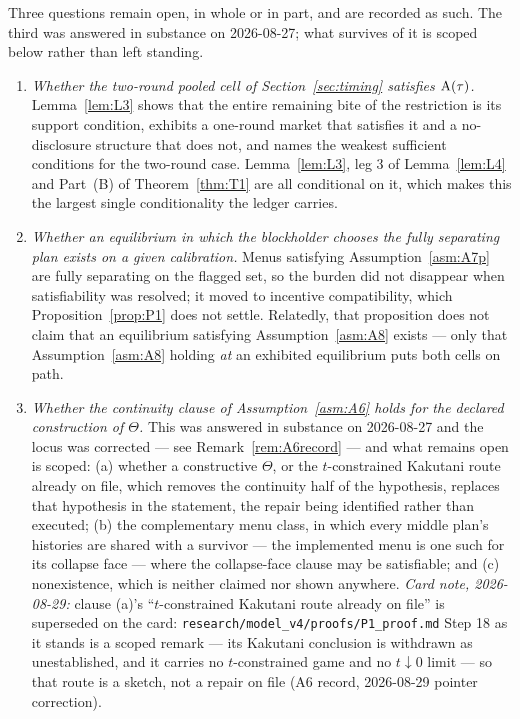 Three questions remain open, in whole or in part, and are recorded as such. The third was answered in
substance on 2026-08-27; what survives of it is scoped below rather than left standing.
\begin{enumerate}[label=(\arabic*),leftmargin=2.4em,itemsep=3pt]
\item \emph{Whether the two-round pooled cell of Section~\ref{sec:timing} satisfies $\mathrm{A}(\tau)$.}
  Lemma~\ref{lem:L3} shows that the entire remaining bite of the restriction is its support
  condition, exhibits a one-round market that satisfies it and a no-disclosure structure that does
  not, and names the weakest sufficient conditions for the two-round case. Lemma~\ref{lem:L3},
  leg 3 of Lemma~\ref{lem:L4} and Part~(B) of Theorem~\ref{thm:T1} are all conditional on it, which
  makes this the largest single conditionality the ledger carries.
\item \emph{Whether an equilibrium in which the blockholder chooses the fully separating plan exists
  on a given calibration.} Menus satisfying Assumption~\ref{asm:A7p} are fully separating on the
  flagged set, so the burden did not disappear when satisfiability was resolved; it moved to
  incentive compatibility, which Proposition~\ref{prop:P1} does not settle. Relatedly, that
  proposition does not claim that an equilibrium satisfying Assumption~\ref{asm:A8} exists --- only
  that Assumption~\ref{asm:A8} holding \emph{at} an exhibited equilibrium puts both cells on path.
\item \emph{Whether the continuity clause of Assumption~\ref{asm:A6} holds for the declared
  construction of $\Theta$.} This was answered in substance on 2026-08-27 and the locus was
  corrected --- see Remark~\ref{rem:A6record} --- and what remains open is scoped: (a) whether a
  constructive $\Theta$, or the $t$-constrained Kakutani route already on file, which removes the
  continuity half of the hypothesis, replaces that hypothesis in the statement, the repair being
  identified rather than executed; (b) the complementary menu class, in which every middle plan's
  histories are shared with a survivor --- the implemented menu is one such for its collapse face
  --- where the collapse-face clause may be satisfiable; and (c) nonexistence, which is neither
  claimed nor shown anywhere. \emph{Card note, 2026-08-29:} clause (a)'s ``$t$-constrained
  Kakutani route already on file'' is superseded on the card:
  \texttt{research/model\_v4/proofs/P1\_proof.md} Step 18 as it stands is a scoped remark ---
  its Kakutani conclusion is withdrawn as unestablished, and it carries no $t$-constrained game
  and no $t \downarrow 0$ limit --- so that route is a sketch, not a repair on file (A6 record,
  2026-08-29 pointer correction).
\end{enumerate}
